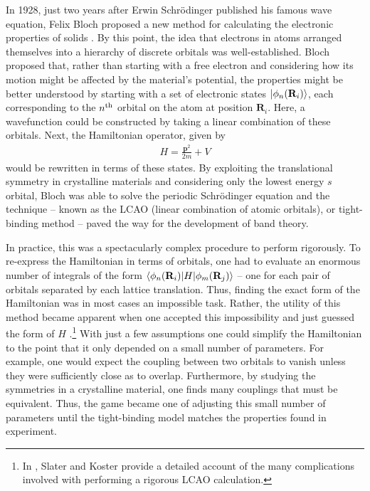 
In 1928, just two years after Erwin Schr\"odinger published his famous wave equation, Felix Bloch proposed a new method for calculating the electronic properties of solids \cite{bloch_uber_1929}. By this point, the idea that electrons in atoms arranged themselves into a hierarchy of discrete orbitals was well-established. Bloch proposed that, rather than starting with a free electron and considering how its motion might be affected by the material's potential, the properties might be better understood by starting with a set of electronic states $\ket{\phi_n(\textbf{R}_i)}$, each corresponding to the $n^{\textup{th}}$ orbital on the atom at position $\textbf{R}_i$. Here, a wavefunction could be constructed by taking a linear combination of these orbitals. Next, the Hamiltonian operator, given by 
\begin{align} \label{eqn:schrodinger_H}
    H = \frac{\textbf{p}^2}{2m} + V
\end{align}
would be rewritten in terms of these states. By exploiting the translational symmetry in crystalline materials and considering only the lowest energy $s$ orbital, Bloch was able to solve the periodic Schr\"odinger equation and the technique -- known as the LCAO (linear combination of atomic orbitals), or tight-binding method -- paved the way for the development of band theory.

In practice, this was a spectacularly complex procedure to perform rigorously. To re-express the Hamiltonian in terms of orbitals, one had to evaluate an enormous number of integrals of the form $\braket{\phi_n(\textbf{R}_i)|H|\phi_m(\textbf{R}_j)}$ -- one for each pair of orbitals separated by each lattice translation. Thus, finding the exact form of the Hamiltonian was in most cases an impossible task. Rather, the utility of this method became apparent when one accepted this impossibility and just guessed the form of $H$ \cite{slater_simplified_1954,harrison_tight-binding_1994}.\footnote{In \cite{slater_simplified_1954}, Slater and Koster provide a detailed account of the many complications involved with performing a rigorous LCAO calculation. 
} 
With just a few assumptions one could simplify the Hamiltonian to the point that it only depended on a small number of parameters. For example, one would expect the coupling between two orbitals to vanish unless they were sufficiently close as to overlap. Furthermore, by studying the symmetries in a crystalline material, one finds many couplings that must be equivalent. Thus, the game became one of adjusting this small number of parameters until the tight-binding model matches the properties found in experiment.


